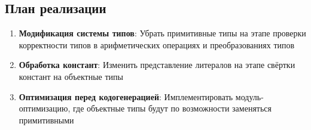 \subsection{План реализации}
\begin{enumerate}
    \item \textbf{Модификация системы типов}: Убрать примитивные типы на этапе проверки корректности типов в арифметических операциях и преобразованиях типов
    \item \textbf{Обработка констант}: Изменить представление литералов на этапе свёртки констант на объектные типы
    \item \textbf{Оптимизация перед кодогенерацией}: Имплементировать модуль-оптимизацию, где объектные типы будут по возможности заменяться примитивными
\end{enumerate}

\newpage